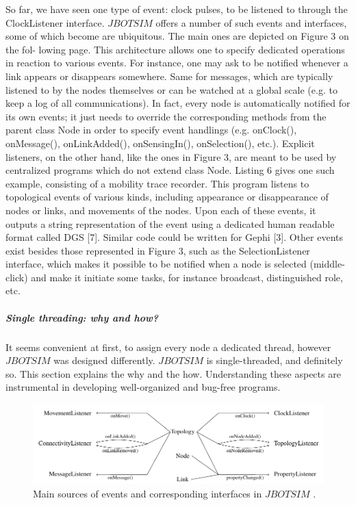 So far, we have seen one type of event: clock pulses, to be listened to through the ClockListener interface. $JBOTSIM$ offers a number of such events and interfaces, some of which become are ubiquitous. The main ones are depicted on Figure 3 on the fol- lowing page. This architecture allows one to specify dedicated operations in reaction to various events. For instance, one may ask to be notified whenever a link appears or disappears somewhere. Same for messages, which are typically listened to by the nodes themselves or can be watched at a global scale (e.g. to keep a log of all communications). In fact, every node is automatically notified for its own events; it just needs to override the corresponding methods from the parent class Node in order to specify event handlings (e.g. onClock(), onMessage(), onLinkAdded(), onSensingIn(), onSelection(), etc.). Explicit listeners, on the other hand, like the ones in Figure 3, are meant to be used by centralized programs which do not extend class Node. Listing 6 gives one such example, consisting of a mobility trace recorder. This program listens to topological events of various kinds, including appearance or disappearance of nodes or links, and movements of the nodes. Upon each of these events, it outputs a string representation of the event using a dedicated human readable format called DGS [7]. Similar code could be written for Gephi [3]. Other events exist besides those represented in Figure 3, such as the SelectionListener interface, which makes it possible to be notified when a node is selected (middle-click) and make it initiate some tasks, for instance broadcast, distinguished role, etc.
\subparagraph{Single threading: why and how?}It seems convenient at first, to assign every node a dedicated thread, however $JBOTSIM$ was designed differently. $JBOTSIM$ is single-threaded, and definitely so. This section explains the why and the how. Understanding these aspects are instrumental in developing well-organized and bug-free programs.
\newpage
\begin{figure}[h!]
	\centering
	\includegraphics[width=0.7\linewidth]{fig_4}
	\caption[Main sources of events and corresponding interfaces in  $JBOTSIM$ .]{Main sources of events and corresponding interfaces in  $JBOTSIM$ .}
	\label{fig:fig4}
\end{figure}


